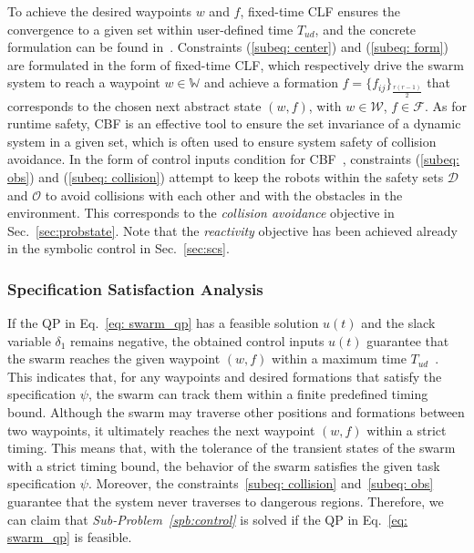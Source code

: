 \documentclass[letterpaper, 10 pt, conference]{ieeeconf}
\begin{document}
To achieve the desired waypoints $w$ and $f$, fixed-time CLF ensures the convergence to a given set within user-defined time $T_{ud}$, and the concrete formulation can be found in~\cite{FxT2022}. Constraints (\ref{subeq: center}) and (\ref{subeq: form}) are formulated in the form of fixed-time CLF, which respectively drive the swarm system to reach a waypoint $w \!\in\! \mathbb{W}$ and achieve a formation $f\!=\!\{f_{ij}\}_{\frac{r(r-1)}{2}}$ that corresponds to the chosen next  abstract state $(w, f)$, with $w\!\in\!\mathcal{W}$, $f\!\in\!\mathcal{F}$. As for runtime safety, CBF is an effective tool to ensure the set invariance of a dynamic system in a given set, which is often used to ensure system safety of collision avoidance. In the form of control inputs condition for CBF~\cite{ames2017}, constraints (\ref{subeq: obs}) and (\ref{subeq: collision}) attempt to keep the robots within the safety sets $\mathcal{D}$ and $\mathcal{O}$ to avoid collisions with each other and with the obstacles in the environment. This corresponds to the \textit{collision avoidance} objective in Sec.~\ref{sec:probstate}. Note that the \textit{reactivity} objective has been achieved already in the symbolic control in Sec.~\ref{sec:scs}.

\subsubsection{Specification Satisfaction Analysis}
If the QP in Eq.~\eqref{eq: swarm_qp} has a feasible solution $u(t)$ and the slack variable $\delta_1$ remains negative, the obtained control inputs $u(t)$ guarantee that the swarm reaches the given waypoint $(w,f)$ within a maximum time $T_{ud}$~\cite{FxT2022}. This indicates that, for any waypoints and desired formations that satisfy the specification $\psi$, the swarm can track them within a finite predefined timing bound. Although the swarm may traverse other positions and formations between two waypoints, it ultimately reaches the next waypoint $(w,f)$ within a strict timing.
This means that, with the tolerance of the transient states of the swarm with a strict timing bound, the behavior of the swarm satisfies the given task specification $\psi$. Moreover, the constraints~\eqref{subeq: collision} and~\eqref{subeq: obs} guarantee that the system never traverses to dangerous regions. Therefore, we can claim that \textit{Sub-Problem~\ref{spb:control}} is solved if the QP in Eq.~\eqref{eq: swarm_qp} is feasible.
\end{document}
